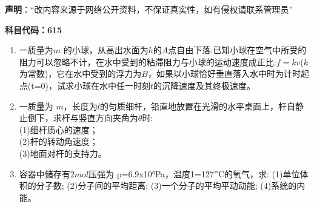 

\textbf{声明}：“改内容来源于网络公开资料，不保证真实性，如有侵权请联系管理员”


\textbf{科目代码：615}

\begin{enumerate}
\item 一质量为$ m$ 的小球，从高出水面为$h$的$ A $点自由下落:已知小球在空气中所受的阻力可以忽略不计，在水中受到的粘滞阻力与小球的运动速度成正比:$f=kv$($k$为常数)，它在水中受到的浮力为$ B$，如果以小球恰好垂直落入水中时为计时起点(t=0)，试求小球在水中任一时刻$t$的沉降速度及其终极速度。
\item 一质量为 $m$，长度为$l$的匀质细杆，铅直地放置在光滑的水平桌面上，杆自静止倒下，求杆与竖直方向夹角为$\theta$时:\\
(1)细杆质心的速度；\\
(2)杆的转动角速度；\\
(3)地面对杆的支持力。
\item 容器中储存有$2mol $压强为 p=6.9x10°Pa，温度1=127'℃的氧气，求:
(1)单位体积的分子数;
(2)分子间的平均距离;
(3)一个分子的平均平动动能;
(4)系统的内能。
\end{enumerate}